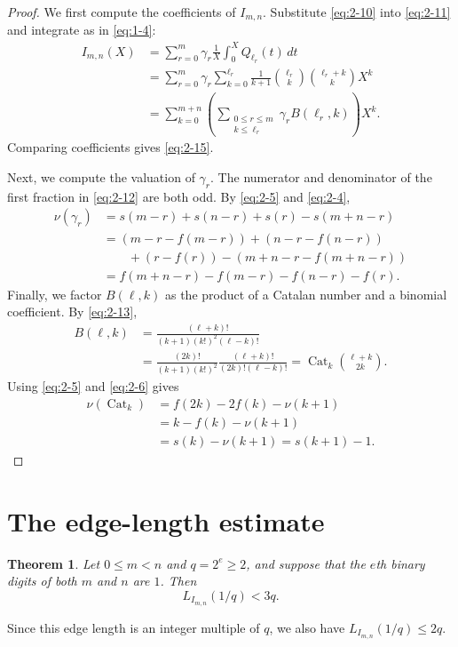 \documentclass[11pt,a4paper]{article}
\numberwithin{equation}{section}
\newtheorem{theorem}{Theorem}[section]
\theoremstyle{definition}
\begin{document}
\begin{proof}
We first compute the coefficients of $I_{m,n}$. Substitute
\eqref{eq:2-10} into \eqref{eq:2-11} and integrate as in
\eqref{eq:1-4}:
\begin{align*}
 I_{m,n}(X)
 &=\sum_{r=0}^m\gamma_r\frac{1}{X}\int_0^XQ_{\ell_r}(t)\,dt\\
 &=\sum_{r=0}^m\gamma_r\sum_{k=0}^{\ell_r}
 \frac{1}{k+1}\binom{\ell_r}{k}\binom{\ell_r+k}{k}X^k\\
 &=\sum_{k=0}^{m+n}\left(
 \sum_{\substack{0\le r\le m\\k\le\ell_r}}
 \gamma_rB(\ell_r,k)\right)X^k.
\end{align*}
Comparing coefficients gives \eqref{eq:2-15}.

Next, we compute the valuation of $\gamma_r$. The numerator and
denominator of the first fraction in \eqref{eq:2-12} are both odd.
By \eqref{eq:2-5} and \eqref{eq:2-4},
\begin{align*}
 \nu(\gamma_r)
 &=s(m-r)+s(n-r)+s(r)-s(m+n-r)\\
 &=(m-r-f(m-r))+(n-r-f(n-r))\\
 &\qquad+(r-f(r))-(m+n-r-f(m+n-r))\\
 &=f(m+n-r)-f(m-r)-f(n-r)-f(r).
\end{align*}
Finally, we factor $B(\ell,k)$ as the product of a Catalan number and
a binomial coefficient. By \eqref{eq:2-13},
\begin{align*}
 B(\ell,k)
 &=\frac{(\ell+k)!}{(k+1)(k!)^2(\ell-k)!}\\
 &=\frac{(2k)!}{(k+1)(k!)^2}
 \frac{(\ell+k)!}{(2k)!(\ell-k)!}
 =\operatorname{Cat}_k\binom{\ell+k}{2k}.
\end{align*}
Using \eqref{eq:2-5} and \eqref{eq:2-6} gives
\begin{align*}
 \nu(\operatorname{Cat}_k)
 &=f(2k)-2f(k)-\nu(k+1)\\
 &=k-f(k)-\nu(k+1)\\
 &=s(k)-\nu(k+1)=s(k+1)-1.
\end{align*}
\end{proof}

\section{The edge-length estimate}

\begin{theorem}\label{thm:3-1}
Let $0\le m<n$ and $q=2^e\ge2$, and suppose that the $e$th binary digits of both $m$ and $n$ are $1$. Then
\begin{equation}
L_{I_{m,n}}(1/q)<3q.
\label{eq:3-1}
\end{equation}
\end{theorem}
Since this edge length is an integer multiple of $q$, we also have $L_{I_{m,n}}(1/q)\le2q$.
\end{document}
